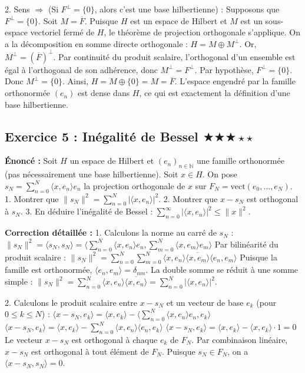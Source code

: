\documentclass[11pt,a4paper]{article}
\begin{document}
2. \textit{}Sens $\Rightarrow$ (Si $F^\perp = \{0\}$, alors c'est une base hilbertienne) :\textit{}
   Supposons que $F^\perp = \{0\}$.
   Soit $M = \overline{F}$. Puisque $H$ est un espace de Hilbert et $M$ est un sous-espace vectoriel fermé de $H$, le théorème de projection orthogonale s'applique.
   On a la décomposition en somme directe orthogonale : $H = M \oplus M^\perp$.
   Or, $M^\perp = (\overline{F})^\perp$. Par continuité du produit scalaire, l'orthogonal d'un ensemble est égal à l'orthogonal de son adhérence, donc $M^\perp = F^\perp$.
   Par hypothèse, $F^\perp = \{0\}$. Donc $M^\perp = \{0\}$.
   Ainsi, $H = M \oplus \{0\} = M = \overline{F}$.
   L'espace engendré par la famille orthonormée $(e_n)$ est dense dans $H$, ce qui est exactement la définition d'une base hilbertienne.


\subsection*{Exercice 5 : Inégalité de Bessel $\bigstar\bigstar\bigstar\star\star$}

\textbf{Énoncé :}
Soit $H$ un espace de Hilbert et $(e_n)_{n \in \mathbb{N}}$ une famille orthonormée (pas nécessairement une base hilbertienne).
Soit $x \in H$. On pose $s_N = \sum_{n=0}^N \langle x, e_n \rangle e_n$ la projection orthogonale de $x$ sur $F_N = \text{vect}(e_0, \dots, e_N)$.
1. Montrer que $\|s_N\|^2 = \sum_{n=0}^N |\langle x, e_n \rangle|^2$.
2. Montrer que $x - s_N$ est orthogonal à $s_N$.
3. En déduire l'inégalité de Bessel : $\sum_{n=0}^\infty |\langle x, e_n \rangle|^2 \leq \|x\|^2$.

\textbf{Correction détaillée :}
1. Calculons la norme au carré de $s_N$ :
   $\|s_N\|^2 = \langle s_N, s_N \rangle = \langle \sum_{n=0}^N \langle x, e_n \rangle e_n, \sum_{m=0}^N \langle x, e_m \rangle e_m \rangle$
   Par bilinéarité du produit scalaire :
   $\|s_N\|^2 = \sum_{n=0}^N \sum_{m=0}^N \langle x, e_n \rangle \overline{\langle x, e_m \rangle} \langle e_n, e_m \rangle$
   Puisque la famille est orthonormée, $\langle e_n, e_m \rangle = \delta_{nm}$. La double somme se réduit à une somme simple :
   $\|s_N\|^2 = \sum_{n=0}^N \langle x, e_n \rangle \overline{\langle x, e_n \rangle} = \sum_{n=0}^N |\langle x, e_n \rangle|^2$.

2. Calculons le produit scalaire entre $x - s_N$ et un vecteur de base $e_k$ (pour $0 \leq k \leq N$) :
   $\langle x - s_N, e_k \rangle = \langle x, e_k \rangle - \langle \sum_{n=0}^N \langle x, e_n \rangle e_n, e_k \rangle$
   $\langle x - s_N, e_k \rangle = \langle x, e_k \rangle - \sum_{n=0}^N \langle x, e_n \rangle \langle e_n, e_k \rangle$
   $\langle x - s_N, e_k \rangle = \langle x, e_k \rangle - \langle x, e_k \rangle \cdot 1 = 0$
   Le vecteur $x - s_N$ est orthogonal à chaque $e_k$ de $F_N$.
   Par combinaison linéaire, $x - s_N$ est orthogonal à tout élément de $F_N$.
   Puisque $s_N \in F_N$, on a $\langle x - s_N, s_N \rangle = 0$.
\end{document}
